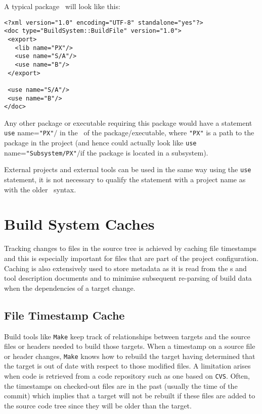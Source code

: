 \ni A typical package \buildfile\ will look like this:
%
%
\small{
\begin{verbatim}
<?xml version="1.0" encoding="UTF-8" standalone="yes"?>
<doc type="BuildSystem::BuildFile" version="1.0">
 <export>
   <lib name="PX"/>
   <use name="S/A"/>
   <use name="B"/>
 </export>

 <use name="S/A"/>
 <use name="B"/>
</doc>
\end{verbatim}
}\normalsize
{}
\ni Any other package or executable requiring this package would have 
a statement \lbkt\texttt{use} name=\texttt{"PX"}$/$\rbkt 
in the \buildfile\ of the package/executable, where
\texttt{"PX"} is a path to the package in the
project (and hence could actually look like \lbkt\texttt{use}
name=\texttt{"Subsystem/PX"}$/$\rbkt if the package is located in
a subsystem).

\ni External projects and external tools can be used in the same way
using the \texttt{use} statement, \ie it is not necessary to qualify
the statement with a project name as with the older \scram\ syntax.

\section{Build System Caches}
\label{sec:bscaches}

Tracking changes to files in the source tree is achieved by caching
file timestamps and this is especially important for files that are
part of the project configuration. Caching is also extensively used 
to store metadata as it is read from the \buildfile s
and tool description documents and to minimise subsequent re-parsing of
build data when the dependencies of a target change.

\subsection{File Timestamp Cache}
\label{sec:bstscache}

Build tools like \texttt{Make} keep track of relationships between
targets and the source files or headers needed to build those targets.
When a timestamp on a source file or header changes, \texttt{Make}
knows how to rebuild the target having determined that the target is
out of date with respect to those modified files. A limitation arises
when code is retrieved from a code repository such as one based on
\texttt{CVS}.  Often, the timestamps on checked-out files are in the
past (usually the time of the commit) which implies that a target will
not be rebuilt if these files are added to the source code tree since
they will be older than the target.

